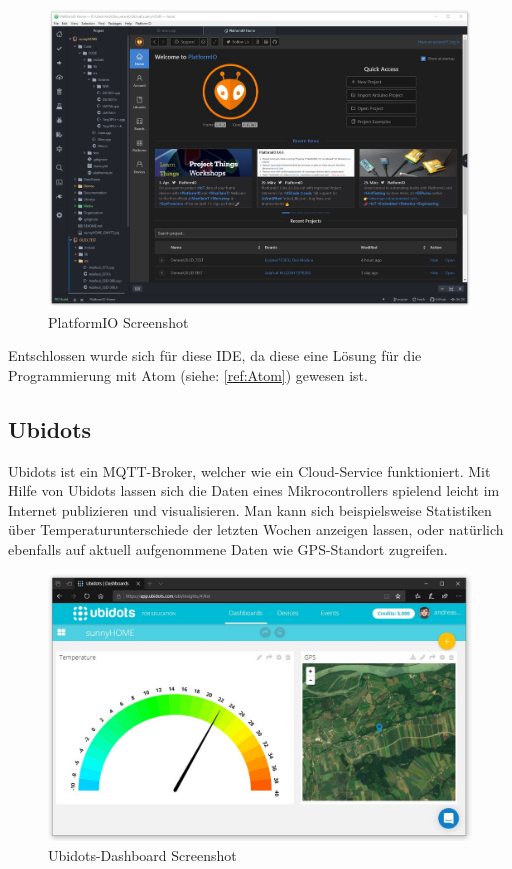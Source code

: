     \begin{figure}[H]
        \centering
        \includegraphics[width=1\textwidth]{./media/images/PlatformIO.jpg}
        \caption{PlatformIO Screenshot\cite{bib:PlatformIO}}
        \label{fig:PlatformIO}
    \end{figure}
    
    Entschlossen wurde sich für diese IDE, da diese eine Lösung für die Programmierung mit Atom (siehe: \ref{ref:Atom}) gewesen ist.
    
    
    
\pagebreak

\subsection{Ubidots \cite{bib:ubidots}}\label{ref:Ubidots}
    
    Ubidots ist ein MQTT-Broker, welcher wie ein Cloud-Service funktioniert. Mit Hilfe von Ubidots lassen sich die Daten eines Mikrocontrollers spielend leicht im Internet publizieren und visualisieren. Man kann sich beispielsweise Statistiken über Temperaturunterschiede der letzten Wochen anzeigen lassen, oder natürlich ebenfalls auf aktuell aufgenommene Daten wie GPS-Standort zugreifen. 
    
    \begin{figure}[H]
        \centering
        \includegraphics[width=1\textwidth]{./media/images/ubidotsSC.jpg}
        \caption{Ubidots-Dashboard Screenshot\cite{bib:ubidots}}
        \label{fig:ubidots}
    \end{figure}
    
